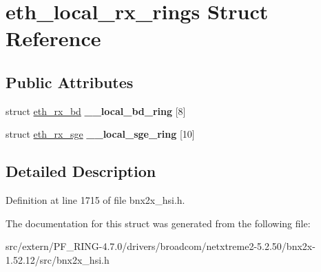 \hypertarget{structeth__local__rx__rings}{
\section{eth\_\-local\_\-rx\_\-rings Struct Reference}
\label{structeth__local__rx__rings}
}
\subsection*{Public Attributes}
\begin{DoxyCompactItemize}
\item 
\hypertarget{structeth__local__rx__rings_a15962b804f655157ffe4e179f473741b}{
struct \hyperlink{structeth__rx__bd}{eth\_\-rx\_\-bd} {\bfseries \_\-\_\-local\_\-bd\_\-ring} \mbox{[}8\mbox{]}}
\label{structeth__local__rx__rings_a15962b804f655157ffe4e179f473741b}

\item 
\hypertarget{structeth__local__rx__rings_a05a7412cb186aad8ae8e5df32858bfdd}{
struct \hyperlink{structeth__rx__sge}{eth\_\-rx\_\-sge} {\bfseries \_\-\_\-local\_\-sge\_\-ring} \mbox{[}10\mbox{]}}
\label{structeth__local__rx__rings_a05a7412cb186aad8ae8e5df32858bfdd}

\end{DoxyCompactItemize}


\subsection{Detailed Description}


Definition at line 1715 of file bnx2x\_\-hsi.h.



The documentation for this struct was generated from the following file:\begin{DoxyCompactItemize}
\item 
src/extern/PF\_\-RING-\/4.7.0/drivers/broadcom/netxtreme2-\/5.2.50/bnx2x-\/1.52.12/src/bnx2x\_\-hsi.h\end{DoxyCompactItemize}
